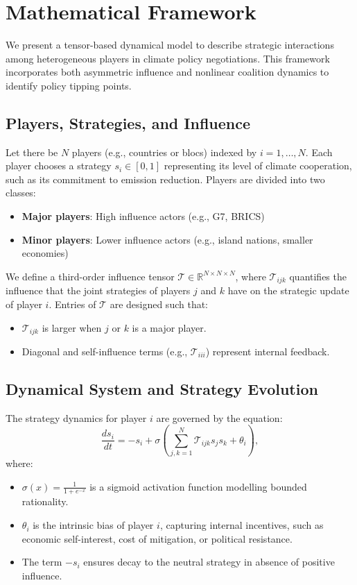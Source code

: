 \documentclass[11pt]{article}
\begin{document}
\section{Mathematical Framework}
\label{sec:math}

We present a tensor-based dynamical model to describe strategic interactions among heterogeneous players in climate policy negotiations. This framework incorporates both asymmetric influence and nonlinear coalition dynamics to identify policy tipping points.

\subsection{Players, Strategies, and Influence}

Let there be $N$ players (e.g., countries or blocs) indexed by $i = 1, \dots, N$. Each player chooses a strategy $s_i \in [0,1]$ representing its level of climate cooperation, such as its commitment to emission reduction. Players are divided into two classes:
\begin{itemize}
	\item \textbf{Major players}: High influence actors (e.g., G7, BRICS)
	\item \textbf{Minor players}: Lower influence actors (e.g., island nations, smaller economies)
\end{itemize}

We define a third-order influence tensor $\mathcal{T} \in \mathbb{R}^{N \times N \times N}$, where $\mathcal{T}_{ijk}$ quantifies the influence that the joint strategies of players $j$ and $k$ have on the strategic update of player $i$. Entries of $\mathcal{T}$ are designed such that:
\begin{itemize}
	\item $\mathcal{T}_{ijk}$ is larger when $j$ or $k$ is a major player.
	\item Diagonal and self-influence terms (e.g., $\mathcal{T}_{iii}$) represent internal feedback.
\end{itemize}

\subsection{Dynamical System and Strategy Evolution}

The strategy dynamics for player $i$ are governed by the equation:
\begin{equation}
	\frac{ds_i}{dt} = -s_i + \sigma\left( \sum_{j,k=1}^{N} \mathcal{T}_{ijk} s_j s_k + \theta_i \right),
	\label{eq:dynamics}
\end{equation}
where:
\begin{itemize}
	\item $\sigma(x) = \frac{1}{1 + e^{-x}}$ is a sigmoid activation function modelling bounded rationality.
	\item $\theta_i$ is the intrinsic bias of player $i$, capturing internal incentives, such as economic self-interest, cost of mitigation, or political resistance.
	\item The term $-s_i$ ensures decay to the neutral strategy in absence of positive influence.
\end{itemize}
\end{document}
